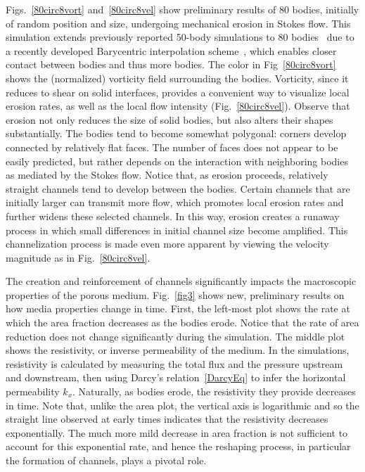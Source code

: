 \documentclass[11pt]{article}
\begin{document}
Figs.~\ref{80circ8vort} and~\ref{80circ8vel} show preliminary results of 80 bodies, initially of random position and size, undergoing mechanical erosion in Stokes flow. This simulation extends previously reported 50-body simulations to 80 bodies~\cite{Quaife2018} due to a recently developed Barycentric interpolation scheme~\cite{bar2014, bar-wu-vee2015, chi-moo-qua2019}, which enables closer contact between bodies and thus more bodies. The color in Fig~\ref{80circ8vort} shows the (normalized) vorticity field surrounding the bodies. Vorticity, since it reduces to shear on solid interfaces, provides a convenient way to visualize local erosion rates, as well as the local flow intensity (Fig.~\ref{80circ8vel}).  Observe that erosion not only reduces the size of solid bodies, but also alters their shapes substantially. The bodies tend to become somewhat polygonal: corners develop connected by relatively flat faces. The number of faces does not appear to be easily predicted, but rather depends on the interaction with neighboring bodies as mediated by the Stokes flow. Notice that, as erosion proceeds, relatively straight channels tend to develop between the bodies. Certain channels that are initially larger can transmit more flow, which promotes local erosion rates and further widens these selected channels. In this way, erosion creates a runaway process in which small differences in initial channel size become amplified. This channelization process is made even more apparent by viewing the velocity magnitude as in Fig.~\ref{80circ8vel}.
 
The creation and reinforcement of channels significantly impacts the macroscopic properties of the porous medium. Fig.~\ref{fig3} shows new, preliminary results on how media properties change in time. First, the left-most plot shows the rate at which the area fraction decreases as the bodies erode. Notice that the rate of area reduction does not change significantly during the simulation. The middle plot shows the resistivity, or inverse permeability of the medium. In the simulations, resistivity is calculated by measuring the total flux and the pressure upstream and downstream, then using Darcy's relation~\eqref{DarcyEq} to infer the horizontal permeability $k_x$. Naturally, as bodies erode, the resistivity they provide decreases in time. Note that, unlike the area plot, the vertical axis is logarithmic and so the straight line observed at early times indicates that the resistivity decreases exponentially. The much more mild decrease in area fraction is not sufficient to account for this exponential rate, and hence the reshaping process, in particular the formation of channels, plays a pivotal role.  
\end{document}
